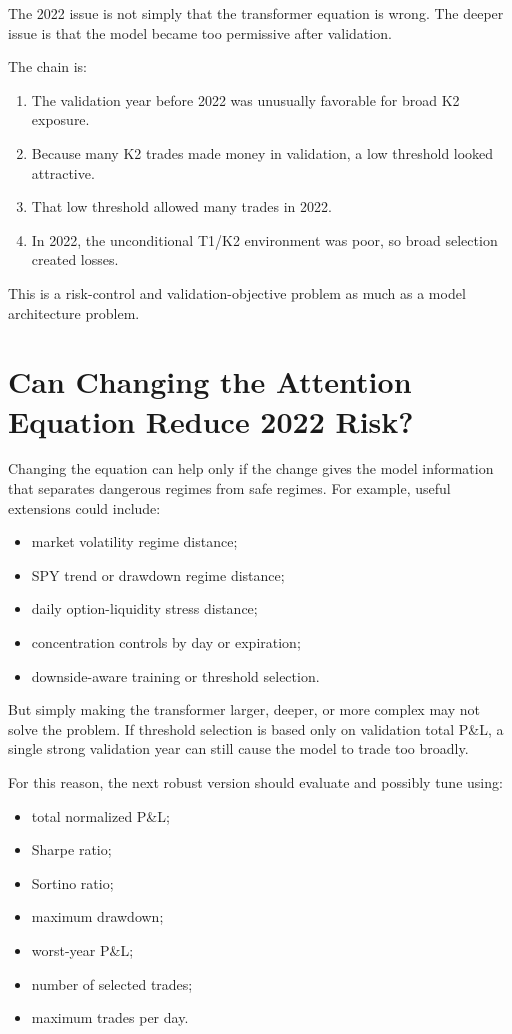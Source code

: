 \documentclass[11pt]{article}
\newcommand{\1}{\mathbf{1}}
\begin{document}
The 2022 issue is not simply that the transformer equation is wrong. The deeper
issue is that the model became too permissive after validation.

The chain is:

\begin{enumerate}[leftmargin=*]
  \item The validation year before 2022 was unusually favorable for broad K2
        exposure.
  \item Because many K2 trades made money in validation, a low threshold looked
        attractive.
  \item That low threshold allowed many trades in 2022.
  \item In 2022, the unconditional T1/K2 environment was poor, so broad
        selection created losses.
\end{enumerate}

This is a risk-control and validation-objective problem as much as a model
architecture problem.

\section{Can Changing the Attention Equation Reduce 2022 Risk?}

Changing the equation can help only if the change gives the model information
that separates dangerous regimes from safe regimes. For example, useful
extensions could include:

\begin{itemize}[leftmargin=*]
  \item market volatility regime distance;
  \item SPY trend or drawdown regime distance;
  \item daily option-liquidity stress distance;
  \item concentration controls by day or expiration;
  \item downside-aware training or threshold selection.
\end{itemize}

But simply making the transformer larger, deeper, or more complex may not solve
the problem. If threshold selection is based only on validation total P\&L, a
single strong validation year can still cause the model to trade too broadly.

For this reason, the next robust version should evaluate and possibly tune
using:

\begin{itemize}[leftmargin=*]
  \item total normalized P\&L;
  \item Sharpe ratio;
  \item Sortino ratio;
  \item maximum drawdown;
  \item worst-year P\&L;
  \item number of selected trades;
  \item maximum trades per day.
\end{itemize}
\end{document}

